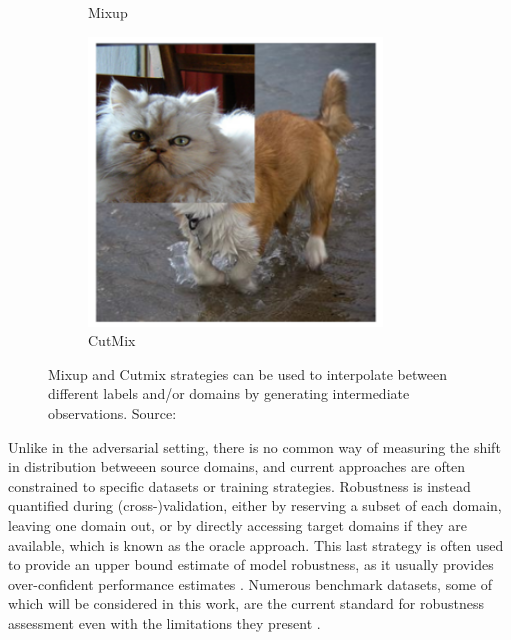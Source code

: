 \begin{figure}[H]
\begin{subfigure}[b]{0.2\textwidth}
        \caption{Mixup 
        \cite{zhangMixupEmpiricalRisk2018}
        }
    \end{subfigure}
    \hspace{1cm}
    \begin{subfigure}[b]{0.2\textwidth}
        \centering
        \includegraphics[width=\textwidth]{img/introduction/da_cutmix.png}
        \caption{CutMix
        \cite{yunCutMixRegularizationStrategy2019}
        }
    \end{subfigure}
       \caption{
        Mixup and Cutmix strategies can be used to interpolate
        between different labels and/or domains
        by generating intermediate observations.
        Source: \cite{yunCutMixRegularizationStrategy2019}
        }
       \label{fig:data_augmentation}
\end{figure}

Unlike in the adversarial setting, there is no common way of measuring
the shift in distribution betweeen source domains, and current approaches
are often constrained to specific datasets or training strategies. 
Robustness is instead quantified during (cross-)validation, either by reserving
a subset of each domain, leaving one domain out, or
by directly accessing target domains if they are available, 
which is known as the oracle approach. This last strategy is often
used to provide an upper bound estimate of model robustness, 
as it usually provides over-confident performance estimates
\cite{zhouDomainGeneralizationSurvey2022}.
Numerous benchmark datasets, some of which will be considered in this work, are the current 
standard for robustness assessment even with
the limitations they present
\cite{kohWILDSBenchmarkIntheWild2021}. 
\\

